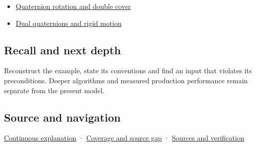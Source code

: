 \begin{itemize}
\tightlist
\item
  \hyperref[appendix-8e61ab68f6b2]{Quaternion rotation and double cover}
\item
  \hyperref[appendix-d1ea57347893]{Dual quaternions and rigid motion}
\end{itemize}

\subsection{Recall and next depth}\label{appendix-965d9260eeab-recall-and-next-depth}

Reconstruct the example, state its conventions and find an input that violates its preconditions. Deeper algorithms and measured production performance remain separate from the present model.

\subsection{Source and navigation}\label{appendix-965d9260eeab-source-and-navigation}

\hyperref[01-foundations-i-ch018-keep-the-promises-visible-while-moving-between-representations]{Continuous explanation} · \hyperref[appendix-fd090d982a15-phase-7---parts-601-700]{Coverage and source gap} · \hyperref[appendix-a103e7846d21-phase-7---source-analysis-and-verification]{Sources and verification}
